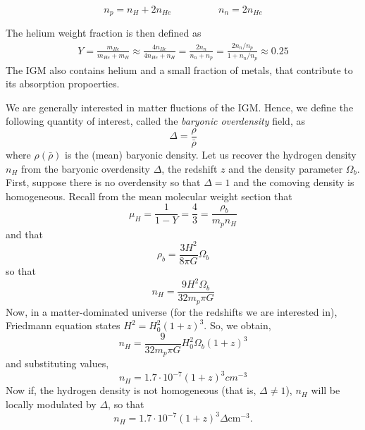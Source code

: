 \begin{equation}
    n_p=n_H+2n_{He} \hspace{2cm} n_n=2n_{He}
\end{equation}

The helium weight fraction is then defined as
\begin{eqnarray}
    Y=\frac{m_{He}}{m_{He}+m_H}\approx \frac{4n_{He}}{4n_{He}+n_H}=\frac{2n_n}{n_n+n_p}=\frac{2 n_n/n_p}{1+n_n/n_p}\approx 0.25 
\end{eqnarray}
The IGM also contains helium and a small fraction of metals, that contribute to its absorption propoerties.

We are generally interested in matter fluctions of the IGM. Hence, we define the following quantity of interest, called the \emph{baryonic overdensity} field, as 
\begin{equation}
    \Delta =\frac{\rho}{\bar{\rho}}
\end{equation}
where $\rho(\bar{\rho})$ is the (mean) baryonic density. Let us recover the hydrogen density $n_H$ from the baryonic overdensity $\Delta$, the redshift $z$ and the density parameter $\Omega_b$.
First, suppose there is no overdensity so that $\Delta=1$ and the comoving density is homogeneous. Recall from the mean molecular weight section that
\begin{equation}
    \mu_H=\frac{1}{1-Y}=\frac{4}{3}=\frac{\rho_b}{m_pn_H}
\end{equation}
and that
\begin{equation}
    \rho_b=\frac{3H^2}{8\pi G}\Omega_b
\end{equation}
so that
\begin{equation}
    n_H=\frac{9H^2 \Omega_b}{32m_p\pi G} 
\end{equation}
Now, in a matter-dominated universe (for the redshifts we are interested in), Friedmann equation states $H^2=H_0^2(1+z)^3$.
So, we obtain,
\begin{equation}
    n_H=\frac{9}{32m_p\pi G}H_0^2\Omega_b (1+z)^3
\end{equation}
and substituting values,
\begin{equation}
    n_H=1.7\cdot 10^{-7}(1+z)^3 cm^{-3}
\end{equation}
Now if, the hydrogen density is not homogeneous (that is, $\Delta \neq 1$), $n_H$ will be locally modulated by $\Delta$, so that
\begin{equation}\label{eq: delta and hydrogen density}
    n_H=1.7\cdot 10^{-7}(1+z)^3 \Delta \mathrm{cm}^{-3} .
\end{equation}
